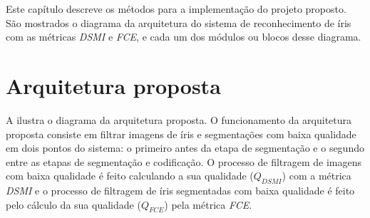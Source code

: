 
\par Este capítulo descreve os métodos para a implementação do projeto proposto. São mostrados o diagrama da arquitetura do sistema de reconhecimento de íris com as métricas \textit{\acrshort{DSMI}} e \textit{\acrshort{FCE}}, e cada um dos módulos ou blocos desse diagrama.


\section{Arquitetura proposta} \label{sec:metodologia:arquitetura}


\par A  ilustra o diagrama da arquitetura proposta. O funcionamento da arquitetura proposta consiste em filtrar imagens de íris e segmentações com baixa qualidade em dois pontos do sistema: o primeiro antes da etapa de segmentação e o segundo entre as etapas de segmentação e codificação. O processo de filtragem de imagens com baixa qualidade é feito calculando a sua qualidade ($Q_{DSMI}$) com a métrica \textit{\acrshort{DSMI}} e o processo de filtragem de íris segmentadas com baixa qualidade é feito pelo cálculo da sua qualidade ($Q_{FCE}$) pela métrica \textit{\acrshort{FCE}}.

